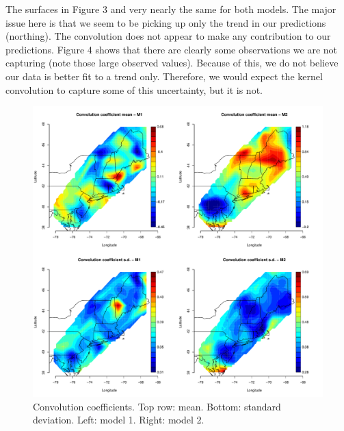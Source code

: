 \documentclass[12pt]{article}
\begin{document}
The surfaces in Figure 3 and very nearly the same for both models. The major issue here is that we seem to be picking up only the trend in our predictions (northing). The convolution does not appear to make any contribution to our predictions. Figure 4 shows that there are clearly some observations we are not capturing (note those large observed values). Because of this, we do not believe our data is better fit to a trend only. Therefore, we would expect the kernel convolution to capture some of this uncertainty, but it is not.

\begin{figure}[ht]
\begin{center}
\includegraphics[scale=0.5]{figs/w.pdf}
\end{center}
\caption{Convolution coefficients. Top row: mean. Bottom: standard deviation. Left: model 1. Right: model 2.}
\end{figure}

% 
\end{document}
